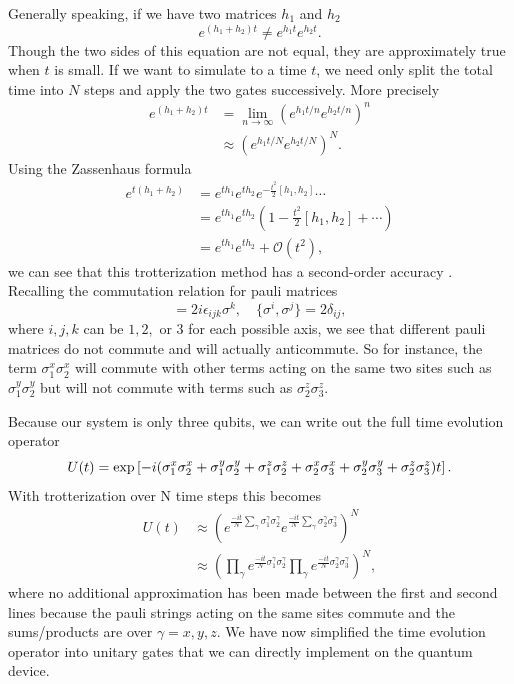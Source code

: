 \documentclass[aps,prl, reprint]{revtex4-2}
\begin{document}
Generally speaking, if we have two matrices $h_1$ and $h_2$
\begin{equation}
e^{(h_1 + h_2)t} \neq e^{h_1 t}e^{h_2 t}.
\end{equation}
Though the two sides of this equation are not equal, they are approximately true when $t$ is small. If we want to simulate to a time $t$, we need only split the total time into $N$ steps and apply the two gates successively. More precisely
\begin{align}
e^{(h_1 + h_2)t}&=\lim _{n \rightarrow \infty}\left(e^{h_1 t/ n} e^{h_2 t / n}\right)^{n}\\
&\approx \left(e^{h_1 t / N} e^{h_2 t/ N}\right)^{N}.
\end{align}
Using the Zassenhaus formula 
\begin{align*}
e^{t(h_1+h_2)}&=e^{t h_1} e^{t h_2} e^{-\frac{t^{2}}{2}[h_1, h_2]}\cdots\\
&= e^{t h_1} e^{t h_2}(1 -\frac{t^{2}}{2}[h_1, h_2] + \cdots)\\
&=e^{t h_1} e^{t h_2} + \mathcal{O}(t^2),
\end{align*}
we can see that this trotterization method has a second-order accuracy \cite{dupays2021closed}.
Recalling the commutation relation for pauli matrices
\begin{equation}
[\sigma^{i}, \sigma^{j}] = 2i \epsilon_{ijk}\sigma^{k}, \quad \{\sigma^{i}, \sigma^{j}\} = 2\delta_{ij	},
\end{equation}
where $i,j,k$ can be $1,2,$ or 3 for each possible axis, we see that different pauli matrices do not commute and will actually anticommute. So for instance, the term $\sigma_{1}^{x} \sigma_{2}^{x}$ will commute with other terms acting on the same two sites such as $\sigma_{1}^{y} \sigma_{2}^{y}$ but will not commute with terms such as $\sigma_{2}^{z} \sigma_{3}^{z}$.

Because our system is only three qubits, we can write out the full time evolution operator
\begin{dmath}
U(t) = \exp\left[-i(\sigma_{1}^{x} \sigma_{2}^{x} + \sigma_{1}^{y} \sigma_{2}^{y} + \sigma_{1}^{z} \sigma_{2}^{z} \\
+ \sigma_{2}^{x} \sigma_{3}^{x} + \sigma_{2}^{y} \sigma_{3}^{y} + \sigma_{2}^{z} \sigma_{3}^{z})t\right].
\end{dmath}
With trotterization over N time steps this becomes
\begin{align*}
U(t) &\approx \left(e^{\frac{-it}{N}\sum_\gamma\sigma_{1}^{\gamma} \sigma_{2}^{\gamma}}e^{\frac{-it}{N}\sum_\gamma\sigma_{2}^{\gamma} \sigma_{3}^{\gamma}}\right)^N\\
&\approx \left(\prod_{\gamma}e^{\frac{-it}{N}\sigma_{1}^{\gamma} \sigma_{2}^{\gamma}}\prod_{\gamma}e^{\frac{-it}{N}\sigma_{2}^{\gamma} \sigma_{3}^{\gamma}}\right)^N,
\end{align*}
where no additional approximation has been made between the first and second lines because the pauli strings acting on the same sites commute and the sums/products are over $\gamma =x,y,z$. We have now simplified the time evolution operator into unitary gates that we can directly implement on the quantum device.
\end{document}
